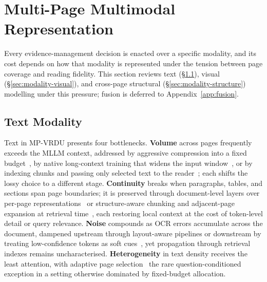 \documentclass[11pt]{article}
\begin{document}
\section{Multi-Page Multimodal Representation}
\label{sec:modality}
Every evidence-management decision is enacted over a specific modality, and its cost depends on how that modality is represented under the tension between page coverage and reading fidelity. This section reviews text (\S\ref{sec:modality-text}), visual (\S\ref{sec:modality-visual}), and cross-page structural (\S\ref{sec:modality-structure}) modelling under this pressure; fusion is deferred to Appendix~\ref{app:fusion}.

\subsection{Text Modality}
\label{sec:modality-text}
Text in MP-VRDU presents four bottlenecks. \textbf{Volume} across pages frequently exceeds the MLLM context, addressed by aggressive compression into a fixed budget~\cite{borchmann2025arctic, dong2024multi}, by native long-context training that widens the input window~\cite{duan2025docopilot}, or by indexing chunks and passing only selected text to the reader~\cite{xie2026wukong, zhang2024cream}; each shifts the lossy choice to a different stage. \textbf{Continuity} breaks when paragraphs, tables, and sections span page boundaries; it is preserved through document-level layers over per-page representations~\cite{tito2023hierarchical, blau2024gram} or structure-aware chunking and adjacent-page expansion at retrieval time~\cite{shin2025multidocfusion, qian2026accurate}, each restoring local context at the cost of token-level detail or query relevance. \textbf{Noise} compounds as OCR errors accumulate across the document, dampened upstream through layout-aware pipelines or downstream by treating low-confidence tokens as soft cues~\cite{hannan2025docslm}, yet propagation through retrieval indexes remains uncharacterised. \textbf{Heterogeneity} in text density receives the least attention, with adaptive page selection~\cite{li2025avir} the rare question-conditioned exception in a setting otherwise dominated by fixed-budget allocation.
\end{document}
